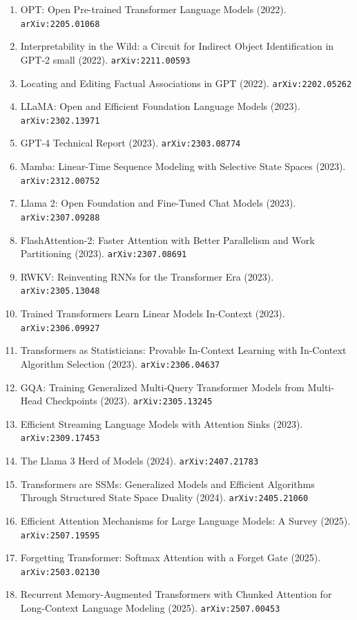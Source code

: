 \documentclass[11pt]{article}
\begin{document}
\begin{enumerate}
  \item OPT: Open Pre-trained Transformer Language Models (2022). \texttt{arXiv:2205.01068}
  \item Interpretability in the Wild: a Circuit for Indirect Object
  Identification in GPT-2 small (2022). \texttt{arXiv:2211.00593}
  \item Locating and Editing Factual Associations in GPT (2022). \texttt{arXiv:2202.05262}
  \item LLaMA: Open and Efficient Foundation Language Models (2023). \texttt{arXiv:2302.13971}
  \item GPT-4 Technical Report (2023). \texttt{arXiv:2303.08774}
  \item Mamba: Linear-Time Sequence Modeling with Selective State Spaces (2023). \texttt{arXiv:2312.00752}
  \item Llama 2: Open Foundation and Fine-Tuned Chat Models (2023). \texttt{arXiv:2307.09288}
  \item FlashAttention-2: Faster Attention with Better Parallelism and Work
  Partitioning (2023). \texttt{arXiv:2307.08691}
  \item RWKV: Reinventing RNNs for the Transformer Era (2023). \texttt{arXiv:2305.13048}
  \item Trained Transformers Learn Linear Models In-Context (2023). \texttt{arXiv:2306.09927}
  \item Transformers as Statisticians: Provable In-Context Learning with
  In-Context Algorithm Selection (2023). \texttt{arXiv:2306.04637}
  \item GQA: Training Generalized Multi-Query Transformer Models from Multi-Head
  Checkpoints (2023). \texttt{arXiv:2305.13245}
  \item Efficient Streaming Language Models with Attention Sinks (2023). \texttt{arXiv:2309.17453}
  \item The Llama 3 Herd of Models (2024). \texttt{arXiv:2407.21783}
  \item Transformers are SSMs: Generalized Models and Efficient Algorithms
  Through Structured State Space Duality (2024). \texttt{arXiv:2405.21060}
  \item Efficient Attention Mechanisms for Large Language Models: A Survey (2025). \texttt{arXiv:2507.19595}
  \item Forgetting Transformer: Softmax Attention with a Forget Gate (2025). \texttt{arXiv:2503.02130}
  \item Recurrent Memory-Augmented Transformers with Chunked Attention for Long-Context Language Modeling (2025). \texttt{arXiv:2507.00453}

\end{enumerate}
\end{document}
